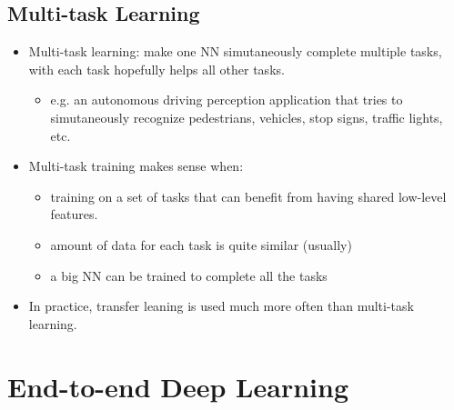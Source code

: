 \subsection{Multi-task Learning}
\begin{itemize}
  \item Multi-task learning: make one NN simutaneously complete multiple tasks, with each task hopefully helps all other tasks. 
  \begin{itemize}
    \item e.g. an autonomous driving perception application that tries to simutaneously recognize pedestrians, vehicles, stop signs, traffic lights, etc.
  \end{itemize}
  \item Multi-task training makes sense when:
  \begin{itemize}
    \item training on a set of tasks that can benefit from having shared low-level features.
    \item amount of data for each task is quite similar (usually)
    \item a big NN can be trained to complete all the tasks
  \end{itemize}
  \item In practice, transfer leaning is used much more often than multi-task learning.
\end{itemize}
\section{End-to-end Deep Learning}

\ifx\PREAMBLE\undefined

\fi